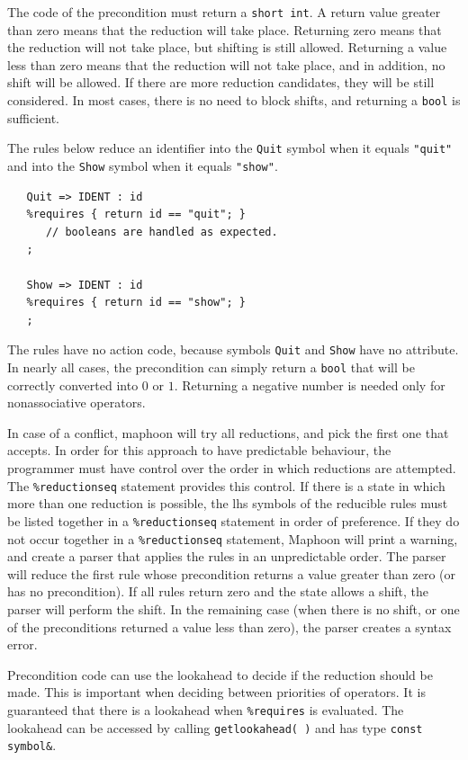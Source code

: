 \documentclass{article}
\begin{document}
The code of the precondition must return a \verb+short int+.
A return value greater than zero means that the reduction
will take place. Returning zero means that the reduction will not
take place, but shifting is still allowed.  
Returning a value less than zero means that the reduction will not
take place, and in addition, no shift will be allowed. If there
are more reduction candidates, they will be still considered. 
In most cases, there is no need to block shifts, and returning
a \verb+bool+ is sufficient.

The rules below reduce an identifier into the \verb+Quit+ symbol
when it equals \verb+"quit"+ and
into the \verb+Show+ symbol when it equals \verb+"show"+. 
\begin{verbatim}
   Quit => IDENT : id
   %requires { return id == "quit"; }
      // booleans are handled as expected. 
   ; 

   Show => IDENT : id
   %requires { return id == "show"; }
   ; \end{verbatim}
The rules have no action code, because symbols \verb+Quit+ and
\verb+Show+ have no attribute.
In nearly all cases, the precondition can simply return a 
\verb+bool+ that will be correctly converted into $ 0 $ or $ 1. $ 
Returning a negative number is needed only for nonassociative
operators.

In case of a conflict, maphoon will try all reductions,
and pick the first one that accepts. 
In order for this approach to have predictable behaviour, 
the programmer must
have control over the order in which reductions are attempted.
The \verb+%reductionseq+ statement provides this control. 
If there is a state in which more than one
reduction is possible, the lhs symbols of the reducible rules
must be listed together in a \verb+%reductionseq+ statement in order 
of preference.
If they do not occur together
in a \verb+%reductionseq+ statement, Maphoon will print a warning,
and create a parser that applies the rules in an unpredictable order. 
The parser will reduce the first rule whose precondition returns
a value greater than zero (or has no precondition). 
If all rules return zero and the state allows a shift, 
the parser will perform the shift. 
In the remaining case (when there is no shift, or
one of the preconditions returned a value less than zero), 
the parser creates a syntax error.

Precondition code can use the lookahead to decide if the reduction
should be made. 
This is important when deciding between
priorities of operators. 
It is guaranteed that there is a lookahead
when \verb+%requires+ is evaluated. 
The lookahead can be accessed by calling 
\verb+getlookahead( )+ and has type \verb+const symbol&+. 
\end{document}
